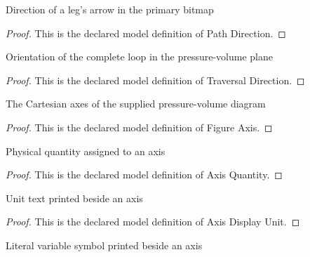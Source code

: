 \begin{definition}
  \label{def:physics:phyx-mini-0417:phyxminiproblems-problemphyxmini0417-pathdirection}
  Direction of a leg's arrow in the primary bitmap
\end{definition}
\begin{proof}
  This is the declared model definition of Path Direction.
\end{proof}
\begin{definition}
  \label{def:physics:phyx-mini-0417:phyxminiproblems-problemphyxmini0417-traversaldirection}
  Orientation of the complete loop in the pressure-volume plane
\end{definition}
\begin{proof}
  This is the declared model definition of Traversal Direction.
\end{proof}
\begin{definition}
  \label{def:physics:phyx-mini-0417:phyxminiproblems-problemphyxmini0417-figureaxis}
  The Cartesian axes of the supplied pressure-volume diagram
\end{definition}
\begin{proof}
  This is the declared model definition of Figure Axis.
\end{proof}
\begin{definition}
  \label{def:physics:phyx-mini-0417:phyxminiproblems-problemphyxmini0417-axisquantity}
  Physical quantity assigned to an axis
\end{definition}
\begin{proof}
  This is the declared model definition of Axis Quantity.
\end{proof}
\begin{definition}
  \label{def:physics:phyx-mini-0417:phyxminiproblems-problemphyxmini0417-axisdisplayunit}
  Unit text printed beside an axis
\end{definition}
\begin{proof}
  This is the declared model definition of Axis Display Unit.
\end{proof}
\begin{definition}
  \label{def:physics:phyx-mini-0417:phyxminiproblems-problemphyxmini0417-axissymbol}
  Literal variable symbol printed beside an axis
\end{definition}
